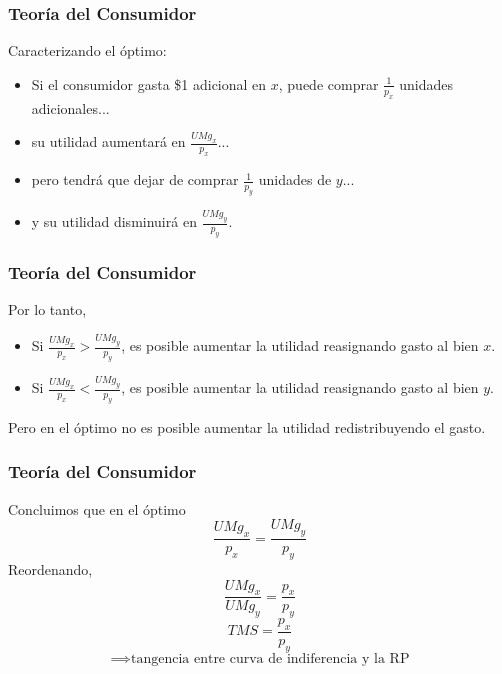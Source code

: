 \documentclass{beamer}
\newcommand{\peq}[1]{{\scriptscriptstyle{#1}}}
\begin{document}
		\begin{frame}
			\frametitle{Teoría del Consumidor}
			Caracterizando el óptimo:
			\begin{itemize}
				\item Si el consumidor gasta \$1 adicional en $x$, puede comprar $\frac{1}{p_\peq{x}}$ unidades adicionales...
				\item su utilidad aumentará en $\frac{UMg_\peq{x}}{p_\peq{x}}$...
				\item pero tendrá que dejar de comprar $\frac{1}{p_\peq{y}}$ unidades de $y$...
				\item y su utilidad disminuirá en $\frac{UMg_\peq{y}}{p_\peq{y}}$.
			\end{itemize}
		\end{frame}

		\begin{frame}
			\frametitle{Teoría del Consumidor}
			Por lo tanto,
			\begin{itemize}
				\item Si $\frac{UMg_\peq{x}}{p_\peq{x}}>\frac{UMg_\peq{y}}{p_\peq{y}}$, es posible aumentar la utilidad reasignando gasto al bien $x$.
				\item Si $\frac{UMg_\peq{x}}{p_\peq{x}}<\frac{UMg_\peq{y}}{p_\peq{y}}$, es posible aumentar la utilidad reasignando gasto al bien $y$.
			\end{itemize}
			Pero en el óptimo no es posible aumentar la utilidad redistribuyendo el gasto.
		\end{frame}

		\begin{frame}
			\frametitle{Teoría del Consumidor}
			Concluimos que en el óptimo $$\frac{UMg_\peq{x}}{p_\peq{x}}=\frac{UMg_\peq{y}}{p_\peq{y}}$$
			Reordenando, $$\frac{UMg_\peq{x}}{UMg_\peq{y}}=\frac{p_\peq{x}}{p_\peq{y}}$$ $$TMS=\frac{p_\peq{x}}{p_\peq{y}}$$ $$\implies\text{tangencia entre curva de indiferencia y la RP}$$
		\end{frame}
\end{document}
